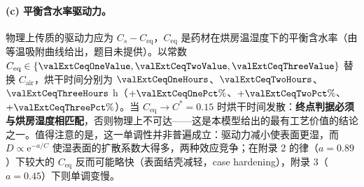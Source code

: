 \paragraph{(c) 平衡含水率驱动力。} 物理上传质的驱动力应为 $C_s-C_{\mathrm{eq}}$，$C_{\mathrm{eq}}$ 是药材在烘房温湿度下的平衡含水率（由等温吸附曲线给出，题目未提供）。以常数 $C_{\mathrm{eq}}\in\{\valExtCeqOneValue,\valExtCeqTwoValue,\valExtCeqThreeValue\}$ 替换 $C_{\mathrm{air}}$，烘干时间分别为 $\valExtCeqOneHours$、$\valExtCeqTwoHours$、$\valExtCeqThreeHours$ h（$+\valExtCeqOnePct\%$、$+\valExtCeqTwoPct\%$、$+\valExtCeqThreePct\%$）。当 $C_{\mathrm{eq}}\to C^\ast=0.15$ 时烘干时间发散：\textbf{终点判据必须与烘房湿度相匹配}，否则物理上不可达——这是本模型给出的最有工艺价值的结论之一。值得注意的是，这一单调性并非普遍成立：驱动力减小使表面更湿，而 $D\propto\mathrm{e}^{-a/C}$ 使湿表面的扩散系数大得多，两种效应竞争；在附录 2 的律（$a=0.89$）下较大的 $C_{\mathrm{eq}}$ 反而可能略快（表面结壳减轻，case hardening），附录 3（$a=0.45$）下则单调变慢。


